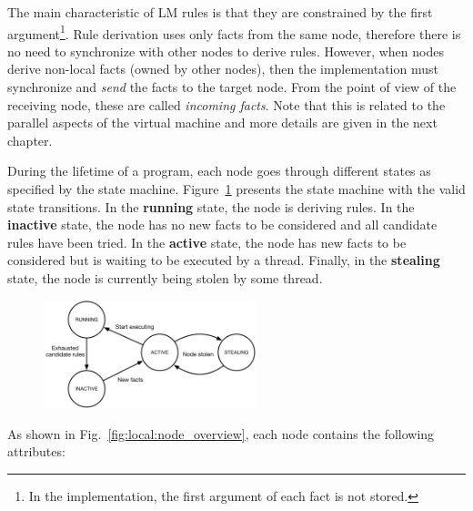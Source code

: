 The main characteristic of LM rules is that they are constrained by the first
argument\footnote{In the implementation, the first argument of each fact is not
stored.}. Rule derivation uses only facts from the same node, therefore there is
no need to synchronize with other nodes to derive rules. However, when nodes
derive non-local facts (owned by other nodes), then the implementation must
synchronize and \emph{send} the facts to the target node. From the point of view
of the receiving node, these are called \emph{incoming facts}. Note that this is related
to the parallel aspects of the virtual machine and more details are given in the
next chapter.

During the lifetime of a program, each node goes through different states as
specified by the state machine. Figure~\ref{fig:local:node_states} presents the
state machine with the valid state transitions.  In the \textbf{running} state,
the node is deriving rules. In the \textbf{inactive} state, the node has no new
facts to be considered and all candidate rules have been tried. In the
\textbf{active} state, the node has new facts to be considered but is waiting to
be executed by a thread. Finally, in the \textbf{stealing} state, the node is
currently being stolen by some thread.

\begin{figure}[ht]
   \centering
   \includegraphics[width=0.55\textwidth]{figures/local/node_state.pdf}
   \label{fig:local:node_states}
\end{figure}

As shown in Fig.~\ref{fig:local:node_overview}, each node contains the
following attributes:

